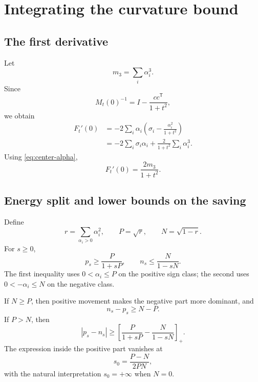 \documentclass[11pt]{article}
\theoremstyle{definition}
\newcommand{\pos}[1]{\left[#1\right]_+}
\begin{document}
\section{Integrating the curvature bound}

\subsection{The first derivative}
Let
\begin{equation}
  m_3=\sum_i\alpha_i^3.
  \label{eq:m3}
\end{equation}
Since
\[
  M_t(0)^{-1}=I-\frac{cc^{\mathsf T}}{1+t^2},
\]
we obtain
\begin{align}
  F_t'(0)
  &=-2\sum_i\alpha_i\left(\sigma_i-\frac{\alpha_i^2}{1+t^2}\right)\\
  &=-2\sum_i\sigma_i\alpha_i+\frac{2}{1+t^2}\sum_i\alpha_i^3.
\end{align}
Using \cref{eq:center-alpha},
\begin{equation}
  \boxed{F_t'(0)=\frac{2m_3}{1+t^2}.}
  \label{eq:Fprime0}
\end{equation}

\subsection{Energy split and lower bounds on the saving}
Define
\begin{equation}
  r=\sum_{\alpha_i>0}\alpha_i^2,
  \qquad
  P=\sqrt r,
  \qquad
  N=\sqrt{1-r}.
  \label{eq:rPN}
\end{equation}
For $s\ge0$,
\begin{equation}
  p_s\ge\frac{P}{1+sP},
  \qquad
  n_s\le\frac{N}{1-sN}.
  \label{eq:pnbounds}
\end{equation}
The first inequality uses $0<\alpha_i\le P$ on the positive sign class; the second uses $0<-\alpha_i\le N$ on the negative class.

If $N\ge P$, then positive movement makes the negative part more dominant, and
\begin{equation}
  n_s-p_s\ge N-P.
  \label{eq:constant-gap}
\end{equation}
If $P>N$, then
\begin{equation}
  |p_s-n_s|
  \ge
  \pos{\frac{P}{1+sP}-\frac{N}{1-sN}}.
  \label{eq:cross-gap}
\end{equation}
The expression inside the positive part vanishes at
\begin{equation}
  s_0=\frac{P-N}{2PN},
  \label{eq:s0}
\end{equation}
with the natural interpretation $s_0=+\infty$ when $N=0$.
\end{document}

